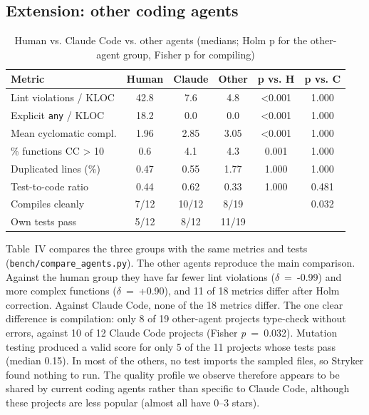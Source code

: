 \documentclass[10pt,conference]{IEEEtran}
\begin{document}
\subsection{Extension: other coding agents}
\begin{table}[t]
\caption{Human vs. Claude Code vs. other agents (medians; Holm p for the other-agent group, Fisher p for compiling)}
\label{tab:agents}
\centering
\scriptsize
\setlength{\tabcolsep}{2.5pt}
\begin{tabular}{lccccc}
\toprule
Metric & Human & Claude & Other & p vs. H & p vs. C \\
\midrule
Lint violations / KLOC & 42.8 & 7.6 & 4.8 & \textless{}0.001 & 1.000 \\
Explicit \texttt{any} / KLOC & 18.2 & 0.0 & 0.0 & \textless{}0.001 & 1.000 \\
Mean cyclomatic compl. & 1.96 & 2.85 & 3.05 & \textless{}0.001 & 1.000 \\
\% functions CC \textgreater{} 10 & 0.6 & 4.1 & 4.3 & 0.001 & 1.000 \\
Duplicated lines (\%) & 0.47 & 0.55 & 1.77 & 1.000 & 1.000 \\
Test-to-code ratio & 0.44 & 0.62 & 0.33 & 1.000 & 0.481 \\
Compiles cleanly & 7/12 & 10/12 & 8/19 &  & 0.032 \\
Own tests pass & 5/12 & 8/12 & 11/19 &  &  \\
\bottomrule
\end{tabular}
\end{table}

Table~IV compares the three groups with the same metrics and tests (\texttt{bench/compare\_agents.py}). The other agents reproduce the main comparison. Against the human group they have far fewer lint violations ($\delta$~=~-0.99) and more complex functions ($\delta$~=~+0.90), and 11 of 18 metrics differ after Holm correction. Against Claude Code, none of the 18 metrics differ. The one clear difference is compilation: only 8 of 19 other-agent projects type-check without errors, against 10 of 12 Claude Code projects (Fisher \emph{p}~=~0.032). Mutation testing produced a valid score for only 5 of the 11 projects whose tests pass (median 0.15). In most of the others, no test imports the sampled files, so Stryker found nothing to run. The quality profile we observe therefore appears to be shared by current coding agents rather than specific to Claude Code, although these projects are less popular (almost all have 0--3 stars).
\end{document}
